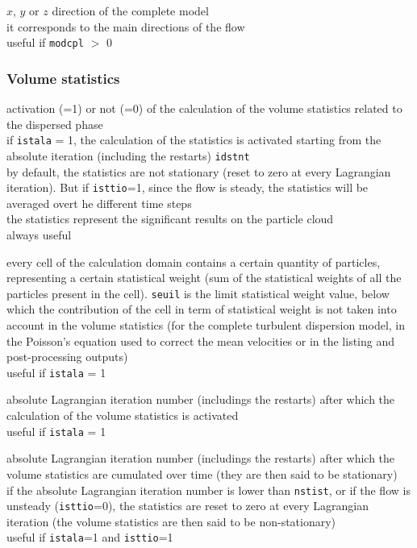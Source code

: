 {$x$, $y$ or $z$ direction of the complete model\\
it corresponds to the main directions of the flow\\
useful if \texttt{modcpl} $>$ 0}

\subsubsection{Volume statistics}

{activation (=1) or not (=0) of the calculation of the volume
statistics related to the dispersed phase\\
if \texttt{istala} = 1, the calculation of the statistics is activated
starting from the absolute iteration (including the restarts) \texttt{idstnt}\\
by default, the statistics are not stationary (reset to zero at every
Lagrangian iteration). But if \texttt{isttio}=1, since the flow is steady,
the statistics will be averaged overt he different time steps\\
the statistics represent the significant results on the particle cloud\\
always useful}

{every cell of the calculation domain contains a certain quantity of
particles, representing a certain statistical weight (sum of the
statistical weights of all the particles present in the cell). \texttt{seuil}
is the limit statistical weight value, below which the contribution of the
cell in term of statistical weight is not taken into account in the volume
statistics (for the complete turbulent dispersion model, in the
Poisson's equation used to correct the mean velocities or in the listing and
post-processing outputs)\\
useful if \texttt{istala} = 1}

{absolute Lagrangian iteration number (includings the restarts) after
which the calculation of the volume statistics is activated\\
useful if \texttt{istala} = 1}

{absolute Lagrangian iteration number (includings the restarts) after
which the volume statistics are cumulated over time (they are then said to be
stationary)\\
if the absolute Lagrangian iteration number is lower than \texttt{nstist},
or if the flow is unsteady (\texttt{isttio}=0), the statistics are reset
to zero at every Lagrangian iteration (the volume statistics are then said
to be non-stationary)\\
useful if \texttt{istala}=1 and \texttt{isttio}=1}

